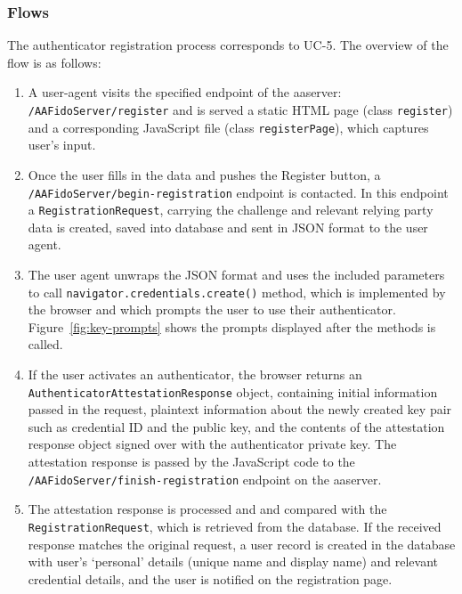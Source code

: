 \subsubsection{Flows}
The authenticator registration process corresponds to UC-5. The overview of the flow is as follows:
% 
\begin{enumerate}[noitemsep]
    \item A user-agent visits the specified endpoint of the \acrshort{aaserver}: \texttt{/AAFidoServer/register} and is served a static HTML page (class \texttt{register}) and a corresponding JavaScript file (class \texttt{registerPage}), which captures user's input.
    \item Once the user fills in the data and pushes the Register button, a \linebreak\texttt{/AAFidoServer/begin-registration} endpoint is contacted. In this endpoint a \linebreak\texttt{RegistrationRequest}, carrying the challenge and relevant relying party data is created, saved into database and sent in JSON format to the user agent.
    \item The user agent unwraps the JSON format and uses the included parameters to call \linebreak\texttt{navigator.credentials.create()} method, which is implemented by the browser and which prompts the user to use their authenticator. Figure~\ref{fig:key-prompts} shows the prompts displayed after the methods is called.
    \item If the user activates an authenticator, the browser returns an \linebreak\texttt{AuthenticatorAttestationResponse} object, containing initial information passed in the request, plaintext information about the newly created key pair such as credential ID and the public key, and the contents of the attestation response object signed over with the authenticator private key. The attestation response is passed by the JavaScript code to the \texttt{/AAFidoServer/finish-registration} endpoint on the \acrshort{aaserver}.
    \item The attestation response is processed and and compared with the \texttt{RegistrationRequest}, which is retrieved from the database. If the received response matches the original request, a user record is created in the database with user's `personal' details (unique name and display name) and relevant credential details, and the user is notified on the registration page.
\end{enumerate}

